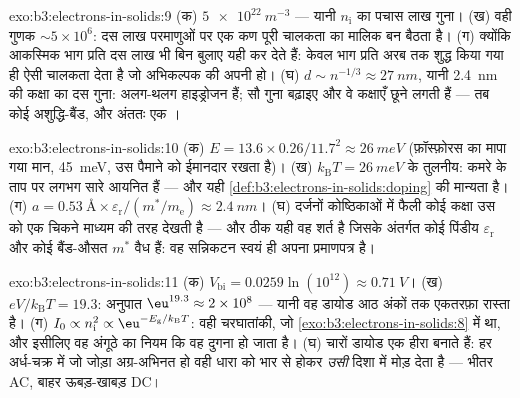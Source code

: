 \begin{solution}{exo:b3:electrons-in-solids:9}
(क) $\qty{5e22}{m^{-3}}$ --- यानी $n_{\text{i}}$ का पचास लाख गुना।
(ख) वही गुणक $\sim5\times10^6$: दस लाख परमाणुओं पर एक कण
पूरी चालकता का मालिक बन बैठता है। (ग) क्योंकि आकस्मिक भाग प्रति दस
लाख भी बिन बुलाए यही कर देते हैं: केवल भाग प्रति अरब तक शुद्ध किया
गया  ही ऐसी चालकता देता है जो अभिकल्पक की अपनी हो। (घ)
$d \sim n^{-1/3}
\approx \qty{27}{nm}$, यानी \qty{2.4}{nm} की कक्षा का दस गुना: 
अलग-थलग हाइड्रोजन हैं;  सौ गुना बढ़ाइए और वे
कक्षाएँ छूने लगती हैं --- तब कोई अशुद्धि-बैंड, और अंततः एक ।
\end{solution}

\begin{solution}{exo:b3:electrons-in-solids:10}
(क) $E = 13.6\times0.26/11.7^2 \approx \qty{26}{meV}$ (फ़ॉस्फ़ोरस का
मापा गया मान, \qty{45}{meV}, उस पैमाने को ईमानदार रखता है)। (ख)
$k_{\text{B}}T = \qty{26}{meV}$ के तुलनीय:
कमरे के ताप पर लगभग सारे  आयनित हैं --- और यही
\cref{def:b3:electrons-in-solids:doping} की मान्यता है। (ग) $a =
\qty{0.53}{\angstrom}\times\varepsilon_{\text{r}}/(m^*/
m_{\text{e}}) \approx \qty{2.4}{nm}$। (घ) दर्जनों कोष्ठिकाओं में
फैली कोई कक्षा उस  को एक चिकने माध्यम की तरह देखती है ---
और ठीक यही वह शर्त है जिसके अंतर्गत कोई पिंडीय
$\varepsilon_{\text{r}}$ और कोई बैंड-औसत $m^*$ वैध हैं:
वह सन्निकटन स्वयं ही अपना प्रमाणपत्र है।
\end{solution}

\begin{solution}{exo:b3:electrons-in-solids:11}
(क) $V_{\text{bi}} = 0.0259\ln(10^{12}) \approx \qty{0.71}{V}$।
(ख) $eV/k_{\text{B}}T = 19.3$: अनुपात $\eu^{19.3} \approx
2\times10^{8}$ --- यानी वह डायोड आठ अंकों तक एकतरफ़ा रास्ता है।
(ग) $I_0 \propto n_{\text{i}}^2 \propto
\eu^{-E_{\text{g}}/k_{\text{B}}T}$: वही चरघातांकी, जो
\cref{exo:b3:electrons-in-solids:8} में था, और इसीलिए वह
अंगूठे का नियम कि वह दुगना हो जाता है। (घ) चारों डायोड एक हीरा बनाते
हैं: हर अर्ध-चक्र में जो जोड़ा अग्र-अभिनत हो वही धारा को भार से होकर
\emph{उसी} दिशा में मोड़ देता है --- भीतर AC, बाहर ऊबड़-खाबड़
DC।
\end{solution}

